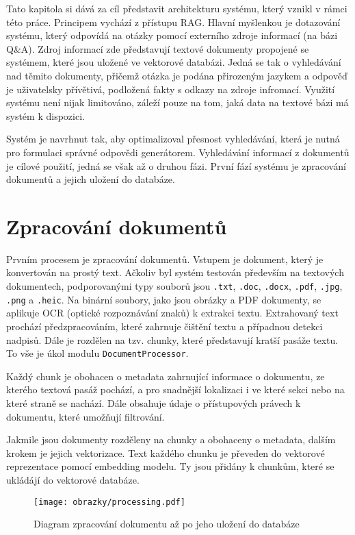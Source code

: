 Tato kapitola si dává za cíl představit architekturu systému, který vznikl v rámci této práce. Principem vychází z přístupu RAG. Hlavní myšlenkou je dotazování systému, který odpovídá na otázky pomocí externího zdroje informací (na bázi Q\&A). Zdroj informací zde představují textové dokumenty propojené se systémem, které jsou uložené ve vektorové databázi. Jedná se tak o vyhledávání nad těmito dokumenty, přičemž otázka je podána přirozeným jazykem a odpověď je uživatelsky přívětivá, podložená fakty s odkazy na zdroje infromací. Využití systému není nijak limitováno, záleží pouze na tom, jaká data na textové bázi má systém k dispozici.

Systém je navrhnut tak, aby optimalizoval přesnost vyhledávání, která je nutná pro formulaci správné odpovědi generátorem. Vyhledávání informací z dokumentů je cílové použití, jedná se však až o druhou fázi. První fází systému je zpracování dokumentů a jejich uložení do databáze. 


\section{Zpracování dokumentů}
\label{zpracovani}
Prvním procesem je zpracování dokumentů. Vstupem je dokument, který je konvertován na prostý text. Ačkoliv byl systém testován především na textových dokumentech, podporovanými typy souborů jsou \texttt{.txt}, \texttt{.doc}, \texttt{.docx}, \texttt{.pdf}, \texttt{.jpg}, \texttt{.png} a \texttt{.heic}. Na binární soubory, jako jsou obrázky a PDF dokumenty, se aplikuje OCR (optické rozpoznávání znaků) k extrakci textu. Extrahovaný text prochází předzpracováním, které zahrnuje čištění textu a případnou detekci nadpisů. Dále je rozdělen na tzv. chunky, které představují kratší pasáže textu. To vše je úkol modulu \texttt{DocumentProcessor}. 


Každý chunk je obohacen o metadata zahrnující informace o dokumentu, ze kterého textová pasáž pochází, a pro snadnější lokalizaci i ve které sekci nebo na které straně se nachází. Dále obsahuje údaje o přístupových právech k dokumentu, které umožňují filtrování. 

Jakmile jsou dokumenty rozděleny na chunky a obohaceny o metadata, dalším krokem je jejich vektorizace. Text každého chunku je převeden do vektorové reprezentace pomocí embedding modelu. Ty jsou přidány k chunkům, které se ukládájí do vektorové databáze.

\begin{figure}[H]
    \centering
    \texttt{[image: obrazky/processing.pdf]}
    \caption{Diagram zpracování dokumentu až po jeho uložení do databáze}
    \label{fig:zpracovani}
\end{figure}

